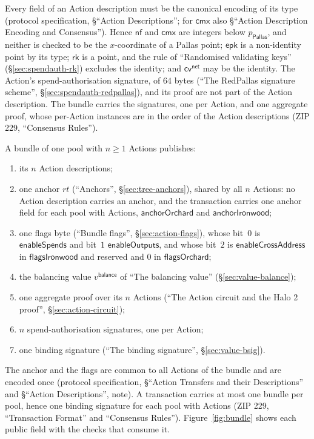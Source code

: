 \documentclass[11pt,a4paper]{article}
\theoremstyle{definition}
\newcommand{\nfsym}{\mathsf{nf}}
\newcommand{\cmx}{\mathsf{cmx}}
\newcommand{\cvsym}{\mathsf{cv}}
\newcommand{\rk}{\mathsf{rk}}
\newcommand{\Pallas}{\ensuremath{\mathsf{Pallas}}}
\begin{document}
Every field of an Action description must be the canonical encoding of its
type (protocol specification, \S``Action Descriptions''; for $\cmx$ also
\S``Action Description Encoding and Consensus''). Hence $\nfsym$ and $\cmx$
are integers below $p_{\Pallas}$, and neither is checked to be the
$x$-coordinate of a Pallas point; $\mathsf{epk}$ is a non-identity point by
its type; $\rk$ is a point, and the rule of ``Randomised validating keys''
(\S\ref{sec:spendauth-rk}) excludes the identity; and
$\cvsym^{\mathsf{net}}$ may be the identity. The Action's
spend-authorisation signature, of $64$ bytes (``The RedPallas signature
scheme'', \S\ref{sec:spendauth-redpallas}), and its proof are not part of
the Action description. The bundle carries the signatures, one per Action,
and one aggregate proof, whose per-Action instances are in the order of the
Action descriptions (ZIP 229, ``Consensus Rules'').

A bundle of one pool with $n \ge 1$ Actions publishes:
\begin{enumerate}[label=(\roman*)]
\item its $n$ Action descriptions;
\item one anchor $\mathit{rt}$ (``Anchors'', \S\ref{sec:tree-anchors}),
  shared by all $n$ Actions: no Action description carries an anchor, and
  the transaction carries one anchor field for each pool with Actions,
  $\mathsf{anchorOrchard}$ and $\mathsf{anchorIronwood}$;
\item one flags byte (``Bundle flags'', \S\ref{sec:action-flags}), whose
  bit~$0$ is $\mathsf{enableSpends}$ and bit~$1$ $\mathsf{enableOutputs}$,
  and whose bit~$2$ is $\mathsf{enableCrossAddress}$ in
  $\mathsf{flagsIronwood}$ and reserved and $0$ in $\mathsf{flagsOrchard}$;
\item the balancing value $v^{\mathsf{balance}}$ of ``The balancing value''
  (\S\ref{sec:value-balance});
\item one aggregate proof over its $n$ Actions (``The Action circuit and the
  Halo 2 proof'', \S\ref{sec:action-circuit});
\item $n$ spend-authorisation signatures, one per Action;
\item one binding signature (``The binding signature'',
  \S\ref{sec:value-bsig}).
\end{enumerate}
The anchor and the flags are common to all Actions of the bundle and are
encoded once (protocol specification, \S``Action Transfers and their
Descriptions'' and \S``Action Descriptions'', note). A transaction carries
at most one bundle per pool, hence one binding signature for each pool with
Actions (ZIP 229, ``Transaction Format'' and ``Consensus Rules'').
Figure~\ref{fig:bundle} shows each public field with the checks that
consume it.
\end{document}
